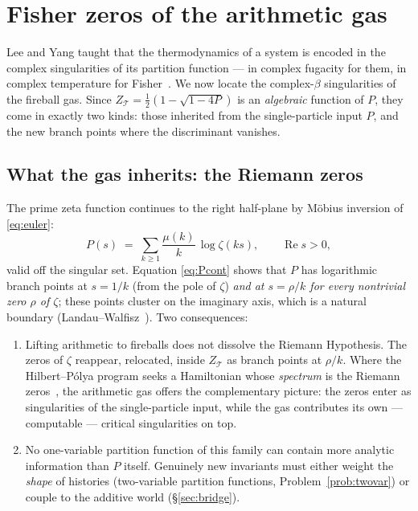 \documentclass[11pt]{article}
\newcommand{\cT}{\mathcal{T}}   %
\numberwithin{equation}{section}
\theoremstyle{plain}
\theoremstyle{definition}
\theoremstyle{remark}
\begin{document}
\section{Fisher zeros of the arithmetic gas}\label{sec:analytic}

Lee and Yang taught that the thermodynamics of a system is encoded in the complex
singularities of its partition function --- in complex fugacity for them, in complex
temperature for Fisher~\cite{leeyang,fisher}. We now locate the complex-$\beta$
singularities of the fireball gas. Since $Z_\cT = \tfrac12(1 - \sqrt{1-4P})$ is an
\emph{algebraic} function of $P$, they come in exactly two kinds: those inherited from
the single-particle input $P$, and the new branch points where the discriminant
vanishes.

\subsection{What the gas inherits: the Riemann zeros}

The prime zeta function continues to the right half-plane by M\"obius inversion of
\eqref{eq:euler}:
\begin{equation}\label{eq:Pcont}
P(s) \;=\; \sum_{k \ge 1} \frac{\mu(k)}{k}\, \log \zeta(ks),
\qquad \operatorname{Re} s > 0,
\end{equation}
valid off the singular set. Equation \eqref{eq:Pcont} shows that $P$ has logarithmic
branch points at $s = 1/k$ (from the pole of $\zeta$) \emph{and at $s = \rho/k$ for
every nontrivial zero $\rho$ of $\zeta$}; these points cluster on the imaginary axis,
which is a natural boundary (Landau--Walfisz~\cite{landauwalfisz}). Two consequences:

\begin{enumerate}
\item Lifting arithmetic to fireballs does not dissolve the Riemann Hypothesis. The
zeros of $\zeta$ reappear, relocated, inside $Z_\cT$ as branch points at $\rho/k$.
Where the Hilbert--P\'olya program seeks a Hamiltonian whose \emph{spectrum} is the
Riemann zeros~\cite{berrykeating}, the arithmetic gas offers the complementary
picture: the zeros enter as singularities of the single-particle input, while the gas
contributes its own --- computable --- critical singularities on top.
\item No one-variable partition function of this family can contain more analytic
information than $P$ itself. Genuinely new invariants must either weight the
\emph{shape} of histories (two-variable partition functions,
Problem~\ref{prob:twovar}) or couple to the additive world (\S\ref{sec:bridge}).
\end{enumerate}
\end{document}

